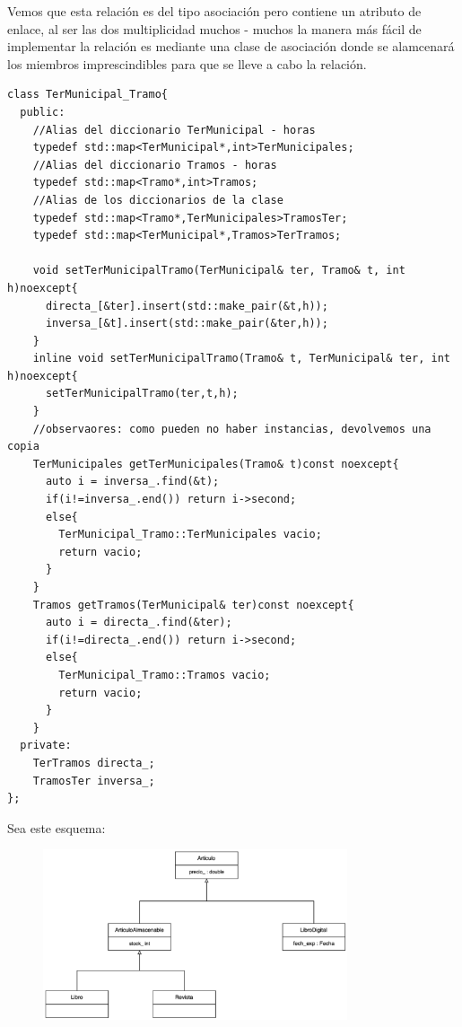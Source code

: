 Vemos que esta relación es del tipo asociación pero contiene un atributo de enlace, al ser las dos multiplicidad muchos - muchos la manera más fácil de implementar la relación es mediante una clase de asociación donde se alamcenará los miembros imprescindibles para que se lleve a cabo la relación.

\begin{verbatim}
class TerMunicipal_Tramo{
  public:
    //Alias del diccionario TerMunicipal - horas
    typedef std::map<TerMunicipal*,int>TerMunicipales;
    //Alias del diccionario Tramos - horas
    typedef std::map<Tramo*,int>Tramos;
    //Alias de los diccionarios de la clase 
    typedef std::map<Tramo*,TerMunicipales>TramosTer;
    typedef std::map<TerMunicipal*,Tramos>TerTramos;

    void setTerMunicipalTramo(TerMunicipal& ter, Tramo& t, int h)noexcept{
      directa_[&ter].insert(std::make_pair(&t,h));
      inversa_[&t].insert(std::make_pair(&ter,h));
    }
    inline void setTerMunicipalTramo(Tramo& t, TerMunicipal& ter, int h)noexcept{
      setTerMunicipalTramo(ter,t,h);
    }
    //observaores: como pueden no haber instancias, devolvemos una copia
    TerMunicipales getTerMunicipales(Tramo& t)const noexcept{
      auto i = inversa_.find(&t);
      if(i!=inversa_.end()) return i->second;
      else{
        TerMunicipal_Tramo::TerMunicipales vacio;
        return vacio;
      }
    }
    Tramos getTramos(TerMunicipal& ter)const noexcept{
      auto i = directa_.find(&ter);
      if(i!=directa_.end()) return i->second;
      else{
        TerMunicipal_Tramo::Tramos vacio;
        return vacio;
      }
    }
  private:
    TerTramos directa_;
    TramosTer inversa_;
};
\end{verbatim}

 Sea este esquema:
\begin{figure}[h]
  \begin{center}
    \includegraphics[width=0.8\textwidth]{assets/Junio2023_2.png}
  \end{center}
\end{figure}

